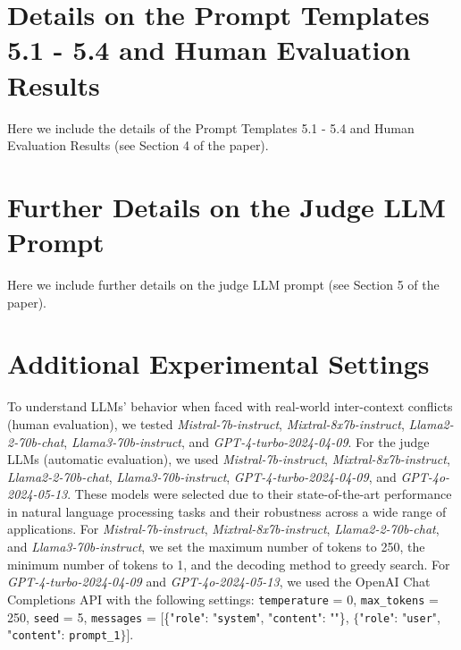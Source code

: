 \documentclass{article}
\begin{document}
\section{Details on the Prompt Templates 5.1 - 5.4 and Human Evaluation Results}

\label{appx:details_prompt}

Here we include the details of the Prompt Templates 5.1 - 5.4 and Human Evaluation Results (see Section 4 of the paper).




\section{Further Details on the Judge LLM Prompt}

\label{appx:details_judge}

Here we include further details on the judge LLM prompt (see Section 5 of the paper).





\section{Additional Experimental Settings}

To understand LLMs’ behavior when faced with real-world inter-context conflicts (human evaluation), we tested \textit{Mistral-7b-instruct}, \textit{Mixtral-8x7b-instruct}, \textit{Llama2-2-70b-chat}, \textit{Llama3-70b-instruct}, and \textit{GPT-4-turbo-2024-04-09}. For the judge LLMs (automatic evaluation), we used \textit{Mistral-7b-instruct}, \textit{Mixtral-8x7b-instruct}, \textit{Llama2-2-70b-chat}, \textit{Llama3-70b-instruct}, \textit{GPT-4-turbo-2024-04-09}, and \textit{GPT-4o-2024-05-13}. These models were selected due to their state-of-the-art performance in natural language processing tasks and their robustness across a wide range of applications. For \textit{Mistral-7b-instruct}, \textit{Mixtral-8x7b-instruct}, \textit{Llama2-2-70b-chat}, and \textit{Llama3-70b-instruct}, we set the maximum number of tokens to 250, the minimum number of tokens to 1, and the decoding method to greedy search. For \textit{GPT-4-turbo-2024-04-09} and \textit{GPT-4o-2024-05-13}, we used the OpenAI Chat Completions API with the following settings: \texttt{temperature} = 0, \texttt{max\_tokens} = 250, \texttt{seed} = 5, \texttt{messages} = [\{"\texttt{role}": "\texttt{system}", "\texttt{content}": ""\}, $\{$"\texttt{role}": "\texttt{user}", "\texttt{content}": \texttt{prompt\_1}$\}$].
\end{document}
